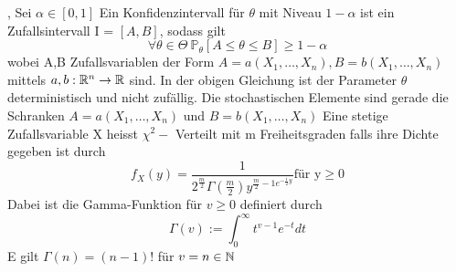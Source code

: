 \sep
\pagebreak
\Def[2.1] \newline
Sei \( \alpha \in [0,1]\) Ein Konfidenzintervall für \( \theta \) mit Niveau \(1 - \alpha \) ist ein Zufallsintervall I = \([A,B ]\), sodass gilt
\[ \forall \theta \in \Theta \ \mathbb{P}_\theta[A \leq \theta \leq B ] \geq 1 - \alpha \]
wobei A,B Zufallsvariablen der Form \( A = a(X_1, \dots , X_n ), B = b(X_1, \dots , X_n )\) mittels \( a,b : \mathbb{R}^n \rightarrow \mathbb{R} \) sind.
\Bem[2.2] \newline
In der obigen Gleichung ist der Parameter  \( \theta \) deterministisch und nicht zufällig. Die stochastischen Elemente sind gerade die Schranken \( A = a(X_1, \dots , X_n )\) und \( B = b(X_1, \dots , X_n)\) \newline
\Def[2.3] \newline
Eine stetige Zufallsvariable X heisst \( \chi^2-\) Verteilt mit m Freiheitsgraden falls ihre Dichte gegeben ist durch \[ f_X(y) = \frac{1}{2^{\frac{m}{2}}\Gamma(\frac{m}{2})y^{\frac{m}{2}-1e^{-\frac{1}{2}y}}} \text{für y} \geq 0\]
Dabei ist die Gamma-Funktion für \( v \geq 0\) definiert durch \[ \Gamma(v) := \int_0^\infty t^{v-1}e^{-t}dt\]
E gilt \(\Gamma(n) = (n-1)! \) für \(v = n \in \mathbb{N} \)
